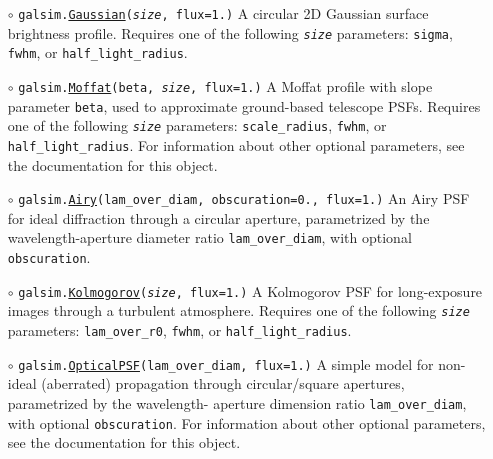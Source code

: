 \documentclass[preprint,10pt]{../../devel/modules/aastex}
\begin{document}
\begin{itemize}
\item[$\circ$]
  \texttt{galsim.}\href{http://galsim-developers.github.io/GalSim/classgalsim_1_1base_1_1_gaussian.html}{\texttt{Gaussian}}\texttt{(\emph{size}, flux=1.)}
    \newline
    A circular 2D Gaussian surface brightness profile. Requires one of the
    following \emph{\texttt{size}} parameters: \texttt{sigma}, \texttt{fwhm}, or \texttt{half\_light\_radius}.
\item[$\circ$]
  \texttt{galsim.}\href{http://galsim-developers.github.com/GalSim/classgalsim_1_1base_1_1_moffat.html}{\texttt{Moffat}}\texttt{(beta, \emph{size}, flux=1.)}
    \newline
    A Moffat profile with slope parameter \texttt{beta}, used to approximate ground-based
    telescope PSFs. Requires one of the
    following \emph{\texttt{size}} parameters: \texttt{scale\_radius},
    \texttt{fwhm}, or \texttt{half\_light\_radius}.  For information
    about other optional parameters, see the documentation for this object.
\item[$\circ$]
  \texttt{galsim.}\href{http://galsim-developers.github.com/GalSim/classgalsim_1_1base_1_1_airy.html}{\texttt{Airy}}\texttt{(lam\_over\_diam, obscuration=0., flux=1.)}
    \newline
    An Airy PSF for ideal diffraction
    through a circular aperture, parametrized by the wavelength-aperture
    diameter ratio \texttt{lam\_over\_diam}, with optional
    \texttt{obscuration}.
\item[$\circ$]
  \texttt{galsim.}\href{http://galsim-developers.github.com/GalSim/classgalsim_1_1base_1_1_kolmogorov.html}{\texttt{Kolmogorov}}\texttt{(\emph{size}, flux=1.)}
    \newline
    A Kolmogorov PSF for long-exposure
    images through a turbulent atmosphere. Requires one of the
    following \emph{\texttt{size}} parameters: \texttt{lam\_over\_r0}, \texttt{fwhm}, or
    \texttt{half\_light\_radius}.
\item[$\circ$]
  \texttt{galsim.}\href{http://galsim-developers.github.io/GalSim/classgalsim_1_1optics_1_1_optical_p_s_f.html}{\texttt{OpticalPSF}}\texttt{(lam\_over\_diam, flux=1.)}
    \newline
    A simple model for non-ideal
    (aberrated) propagation through circular/square apertures, parametrized by the wavelength-
    aperture dimension ratio \texttt{lam\_over\_diam}, with
    optional \texttt{obscuration}.  For information
    about other optional parameters, see the documentation for this object.

\end{itemize}
\end{document}
